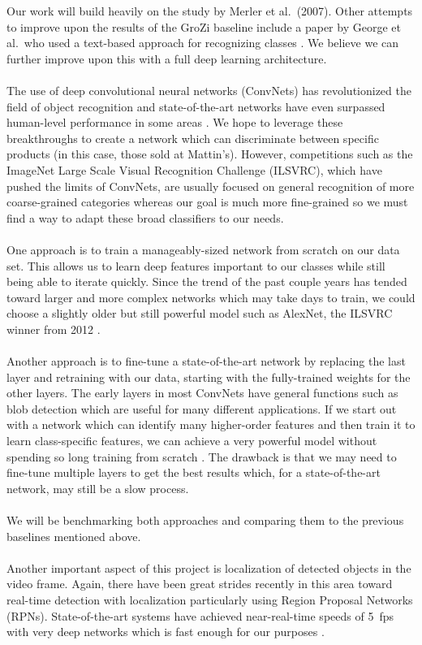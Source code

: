 \documentclass{article}
\begin{document}
Our work will build heavily on the study by Merler et al.\ (2007). Other attempts to improve upon the results of the GroZi baseline include a paper by George et al.\ who used a text-based approach for recognizing classes \cite{george15}. We believe we can further improve upon this with a full deep learning architecture.
\\ \\
The use of deep convolutional neural networks (ConvNets) has revolutionized the field of object recognition and state-of-the-art networks have even surpassed human-level performance in some areas \cite{he15,russakovsky14}. We hope to leverage these breakthroughs to create a network which can discriminate between specific products (in this case, those sold at Mattin's). However, competitions such as the ImageNet Large Scale Visual Recognition Challenge (ILSVRC), which have pushed the limits of ConvNets, are usually focused on general recognition of more coarse-grained categories whereas our goal is much more fine-grained so we must find a way to adapt these broad classifiers to our needs.
\\ \\
One approach is to train a manageably-sized network from scratch on our data set. This allows us to learn deep features important to our classes while still being able to iterate quickly. Since the trend of the past couple years has tended toward larger and more complex networks which may take days to train, we could choose a slightly older but still powerful model such as AlexNet, the ILSVRC winner from 2012 \cite{krizhevsky12}.
\\ \\
Another approach is to fine-tune a state-of-the-art network by replacing the last layer and retraining with our data, starting with the fully-trained weights for the other layers. The early layers in most ConvNets have general functions such as blob detection which are useful for many different applications. If we start out with a network which can identify many higher-order features and then train it to learn class-specific features, we can achieve a very powerful model without spending so long training from scratch \cite{donahue13}. The drawback is that we may need to fine-tune multiple layers to get the best results which, for a state-of-the-art network, may still be a slow process.
\\ \\
We will be benchmarking both approaches and comparing them to the previous baselines mentioned above.
\\ \\
Another important aspect of this project is localization of detected objects in the video frame. Again, there have been great strides recently in this area toward real-time detection with localization particularly using Region Proposal Networks (RPNs). State-of-the-art systems have achieved near-real-time speeds of 5~fps with very deep networks which is fast enough for our purposes \cite{ren15}.
\end{document}
